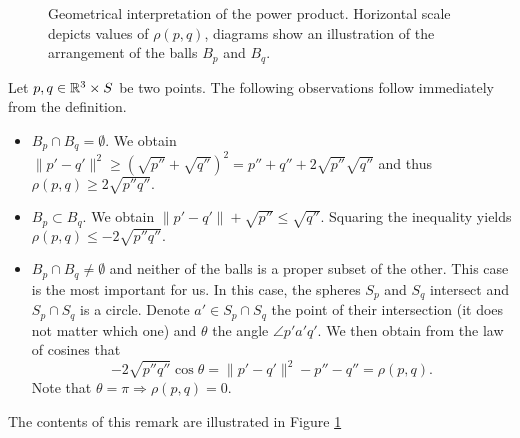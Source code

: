 \begin{figure}[t]
{
}
\caption{Geometrical interpretation of the power product. Horizontal scale depicts values of $\rho(p,q)$, diagrams show an illustration of the arrangement of the balls $B_p$ and $B_q$. }
\label{fig:powerproduct}
\end{figure}





\begin{remark}
Let $p,q \in {\mathbb R^3}\times S$ be two points. The following observations follow immediately from the definition. 
\begin{itemize}
	\item $B_p\cap B_q = \emptyset$. We obtain $\|p'-q'\|^2 \geq (\sqrt{p''} + \sqrt{q''})^2 = p'' + q'' + 2\sqrt{p''}\sqrt{q''}$ and thus $\rho(p,q) \geq 2\sqrt{p'' q''}.$ 
	\item $B_p \subset B_q$. We obtain $\|p'-q'\| + \sqrt{p''} \leq \sqrt{q''} $. Squaring the inequality yields $\rho(p,q) \leq -2\sqrt{p'' q''}.$ 
	\item $B_p \cap B_q \neq \emptyset$ and neither of the balls is a proper subset of the other. This case is the most important for us. In this case, the spheres $S_p$ and $S_q$ intersect and $S_p\cap S_q$ is a circle. Denote $a' \in S_p \cap S_q$ the point of their intersection (it does not matter which one) and $\theta$ the angle $\angle p'a'q'$. We then obtain from the law of cosines that 
		$$- 2\sqrt{p'' q''}\cos \theta = \|p'-q'\|^2 - p'' - q'' = \rho(p,q).$$
	Note that $\theta = \pi \Rightarrow \rho(p,q)=0$.
\end{itemize}
The contents of this remark are illustrated in Figure \ref{fig:powerproduct}
\end{remark}

